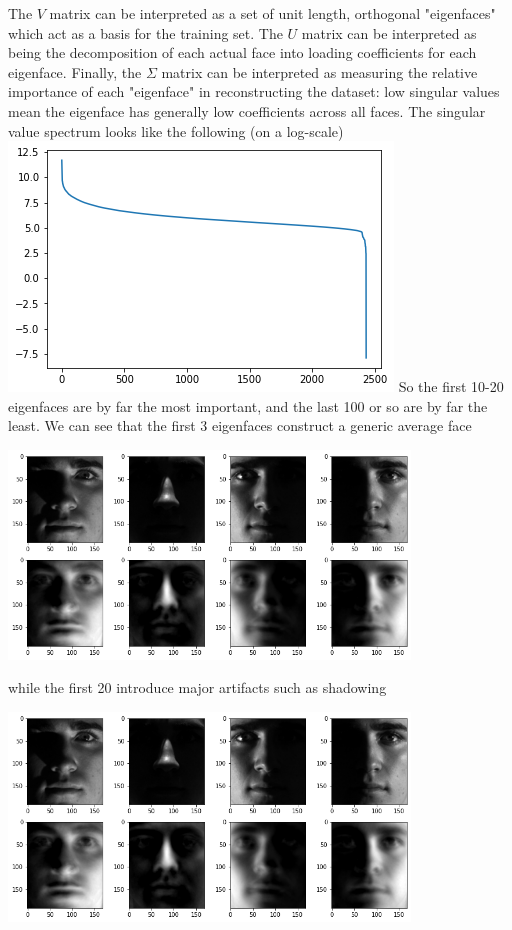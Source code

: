 \documentclass[letter, 12pt]{article}
\begin{document}
The $V$ matrix can be interpreted as a set of unit length, orthogonal "eigenfaces" which act as a basis for the training set. The $U$ matrix can be interpreted as being the decomposition of each actual face into loading coefficients for each eigenface. Finally, the $\Sigma$ matrix can be interpreted as measuring the relative importance of each "eigenface" in reconstructing the dataset: low singular values mean the eigenface has generally low coefficients across all faces. The singular value spectrum looks like the following (on a log-scale)
\includegraphics{logscale.png}
So the first 10-20 eigenfaces are by far the most important, and the last 100 or so are by far the least. We can see that the first 3 eigenfaces construct a generic average face
\begin{center}
\includegraphics[width=0.8\textwidth]{reconstruction.png}
\end{center}
while the first 20 introduce major artifacts such as shadowing
\begin{center}
\includegraphics[width=0.8\textwidth]{reconstruction20.png}
\end{center}
\end{document}

